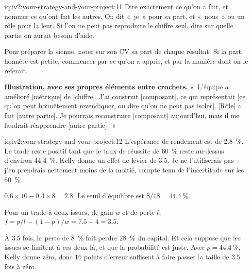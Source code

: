 \begin{solution}{iq:iv2:your-strategy-and-your-project:11}
Dire exactement ce qu'on a fait, et nommer ce qu'ont fait les autres. On dit «~je~» pour sa part, et «~nous~» ou un rôle pour la leur. Si l'on ne peut pas reproduire le chiffre seul, dire sur quelle partie on aurait besoin d'aide.

Pour préparer la sienne, noter sur son CV sa part de chaque résultat. Si la part honnête est petite, commencer par ce qu'on a appris, et par la manière dont on le referait.

\textbf{Illustration, avec ses propres éléments entre crochets.} «~L'équipe a amélioré [métrique] de [chiffre]. J'ai construit [composant], ce qui représentait [ce qu'on peut honnêtement revendiquer, ou dire qu'on ne peut pas isoler]. [Rôle] a fait [autre partie]. Je pourrais reconstruire [composant] aujourd'hui, mais il me faudrait réapprendre [autre partie].~»

\end{solution}

\begin{solution}{iq:iv2:your-strategy-and-your-project:12}
L'espérance de rendement est de 2.8~\%. Le trade reste positif tant que le taux de réussite de 60~\% reste au-dessus d'environ 44.4~\%. Kelly donne un effet de levier de 3.5. Je ne l'utiliserais pas~: j'en prendrais nettement moins de la moitié, compte tenu de l'incertitude sur les 60~\%.

$0.6 \times 10 - 0.4 \times 8 = 2.8$. Le seuil d'équilibre est $8/18 = 44.4~\%$.

Pour un trade à deux issues, de gain $w$ et de perte $l$, $f = p/l - (1 - p)/w = 7.5 - 4 = 3.5$.

À 3.5 fois, la perte de 8~\% fait perdre 28~\% du capital. Et cela suppose que les issues se limitent à ces deux-là, et que la probabilité est juste. Avec $p = 44.4~\%$, Kelly donne zéro, donc 16 points d'erreur suffisent à faire passer la taille de 3.5 fois à zéro.

\end{solution}

